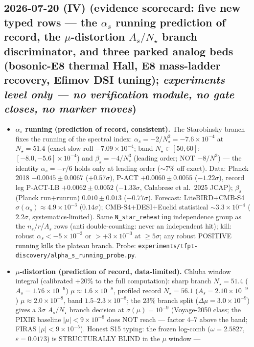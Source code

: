 \subsection*{2026-07-20 (IV) (evidence scorecard: five new typed rows --- the $\alpha_s$ running prediction of record, the $\mu$-distortion $A_s/N_\star$ branch discriminator, and three parked analog beds (bosonic-E8 thermal Hall, E8 mass-ladder recovery, Efimov DSI tuning); \emph{experiments level only --- no verification module, no gate closes, no marker moves})}
\begin{itemize}[leftmargin=1.5em]
\item \textbf{$\alpha_s$ running (prediction of record, consistent).} The Starobinsky branch fixes
the running of the spectral index: $\alpha_s=-2/N_\star^2=-7.6\times10^{-4}$ at $N_\star{=}51.4$
(exact slow roll $-7.09\times10^{-4}$; band $N_\star\in[50,60]$: $[-8.0,-5.6]\times10^{-4}$) and
$\beta_s=-4/N_\star^3$ (leading order; NOT $-8/N^3$) --- the identity $\alpha_s=-r/6$ holds only at
leading order ($\sim$7\% off exact). Data: Planck 2018 $-0.0045\pm0.0067$ ($+0.57\sigma$), P-ACT
$+0.0060\pm0.0055$ ($-1.22\sigma$), record leg P-ACT-LB $+0.0062\pm0.0052$ ($-1.33\sigma$,
Calabrese et al.\ 2025 JCAP); $\beta_s$ (Planck run$+$runrun) $0.010\pm0.013$ ($-0.77\sigma$).
Forecast: LiteBIRD$+$CMB-S4 $\sigma(\alpha_s)\approx4.9\times10^{-3}$ ($0.14\sigma$);
CMB-S4$+$DESI$+$Euclid statistical $\sim3.3\times10^{-4}$ ($2.2\sigma$, systematics-limited). Same
\texttt{N\_star\_reheating} independence group as the $n_s$/$r$/$A_s$ rows (anti double-counting:
never an independent hit); kill: robust $\alpha_s<-5\times10^{-3}$ or $>+3\times10^{-3}$ at
$\ge5\sigma$; any robust POSITIVE running kills the plateau branch. Probe:
\texttt{experiments/tfpt-discovery/alpha\_s\_running\_probe.py}.
\item \textbf{$\mu$-distortion (prediction of record, data-limited).} Chluba window integral
(calibrated $+20\%$ to the full computation): sharp branch $N_\star{=}51.4$ ($A_s{=}1.76\times
10^{-9}$) $\mu\approx1.6\times10^{-8}$, profiled record $N_\star{=}56.1$ ($A_s{=}2.10\times10^{-9}$)
$\mu\approx2.0\times10^{-8}$, band $1.5$--$2.3\times10^{-8}$; the $23\%$ branch split
($\Delta\mu=3.0\times10^{-9}$) gives a $3\sigma$ $A_s/N_\star$ branch decision at
$\sigma(\mu)=10^{-9}$ (Voyage-2050 class; the PIXIE baseline $|\mu|<9\times10^{-8}$ does NOT reach
--- factor 4--7 above the band; FIRAS $|\mu|<9\times10^{-5}$). Honest S15 typing: the frozen
log-comb ($\omega=2.5827$, $\varepsilon=0.0173$) is STRUCTURALLY BLIND in the $\mu$ window ---

\end{itemize}
